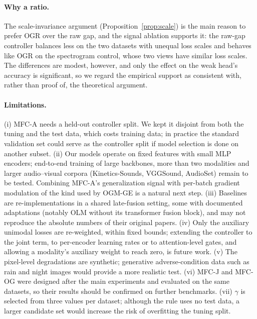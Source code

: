 \documentclass[fleqn,10pt]{wlscirep}
\begin{document}
\paragraph{Why a ratio.} The scale-invariance argument (Proposition~\ref{prop:scale}) is the main reason to prefer OGR over the raw gap, and the signal ablation supports it: the raw-gap controller balances less on the two datasets with unequal loss scales and behaves like OGR on the spectrogram control, whose two views have similar loss scales. The differences are modest, however, and only the effect on the weak head's accuracy is significant, so we regard the empirical support as consistent with, rather than proof of, the theoretical argument.

\paragraph{Limitations.} (i) MFC-A needs a held-out controller split. We kept it disjoint from both the tuning and the test data, which costs training data; in practice the standard validation set could serve as the controller split if model selection is done on another subset. (ii) Our models operate on fixed features with small MLP encoders; end-to-end training of large backbones, more than two modalities and larger audio--visual corpora (Kinetics-Sounds, VGGSound\cite{chen2020vggsound}, AudioSet\cite{gemmeke2017audio}) remain to be tested. Combining MFC-A's generalization signal with per-batch gradient modulation of the kind used by OGM-GE is a natural next step. (iii) Baselines are re-implementations in a shared late-fusion setting, some with documented adaptations (notably OLM without its transformer fusion block), and may not reproduce the absolute numbers of their original papers. (iv) Only the auxiliary unimodal losses are re-weighted, within fixed bounds; extending the controller to the joint term, to per-encoder learning rates or to attention-level gates, and allowing a modality's auxiliary weight to reach zero, is future work. (v) The pixel-level degradations are synthetic; generative adverse-condition data such as rain and night images\cite{lan2025sustechgan} would provide a more realistic test. (vi) MFC-J and MFC-OG were designed after the main experiments and evaluated on the same datasets, so their results should be confirmed on further benchmarks. (vii) $\gamma$ is selected from three values per dataset; although the rule uses no test data, a larger candidate set would increase the risk of overfitting the tuning split.
\end{document}

